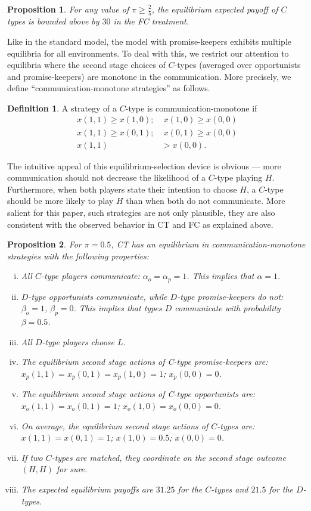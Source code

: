 \documentclass[12pt]{article}
\newtheorem{proposition}{Proposition} \theoremstyle{definition}
\newtheorem{definition}{Definition}
\theoremstyle{break}
\begin{document}
\begin{proposition}\label{prop:FC-bounded}
	For any value of $\pi\geq \frac{2}{5}$, the equilibrium expected payoff of $C$ types is bounded above by $30$ in the FC treatment.
\end{proposition}
%
Like in the standard model, the model with promise-keepers exhibits multiple equilibria for all environments. To deal with this, we restrict our attention to equilibria where the second stage choices of $C$-types (averaged over opportunists and promise-keepers) are monotone in the communication. More precisely, we define ``communication-monotone strategies'' as follows.
\begin{definition}
	A strategy of a $C$-type is communication-monotone if 
	\begin{align*}
x(1,1)\geq x(1,0);&\;x(1,0) \geq x(0,0)\\
x(1,1) \geq x(0,1);&\;x(0,1)\geq x(0,0)\\	
x(1,1)&>x(0,0).
\end{align*}
\end{definition}
The intuitive appeal of this equilibrium-selection device is obvious --- more communication should not decrease the likelihood of a $C$-type playing $H$. Furthermore, when both players state their intention to choose $H$, a $C$-type should be more likely to play $H$ than when both do not communicate. More salient for this paper, such strategies are not only plausible, they are also consistent with the observed behavior in CT and FC as explained above.

\begin{proposition}\label{prop:CT}
	For $\pi =0.5$, CT has an equilibrium in communication-monotone strategies with the following properties: 
	\begin{enumerate}[i)]\setlength\itemsep{0em}
		\item All $C$-type players communicate: $\alpha_o=\alpha_p=1$. This implies that $\alpha=1$.
		\item $D$-type opportunists communicate, while $D$-type promise-keepers do not: $\beta_o=1$, $\beta_p=0$. This implies that types $D$ communicate with probability $\beta=0.5$.
		\item All $D$-type players choose $L$.
		\item The equilibrium second stage actions of C-type promise-keepers are:  $x_p(1,1)=x_p(0,1)=x_p(1,0)=1$; $x_p(0,0)=0$.
		\item The equilibrium second stage actions of C-type opportunists are: $x_o(1,1)=x_o(0,1)=1$; $x_o(1,0)=x_o(0,0)=0$.
		\item On average, the equilibrium second stage actions of $C$-types are: $x(1,1)=x(0,1)=1$; $x(1,0)=0.5$; $x(0,0)=0$.
		\item If two $C$-types are matched, they coordinate on the second stage outcome $(H,H)$ for sure.
		\item The expected equilibrium payoffs are $31.25$ for the $C$-types and $21.5$ for the $D$-types.
	\end{enumerate} 
\end{proposition} 
\end{document}
